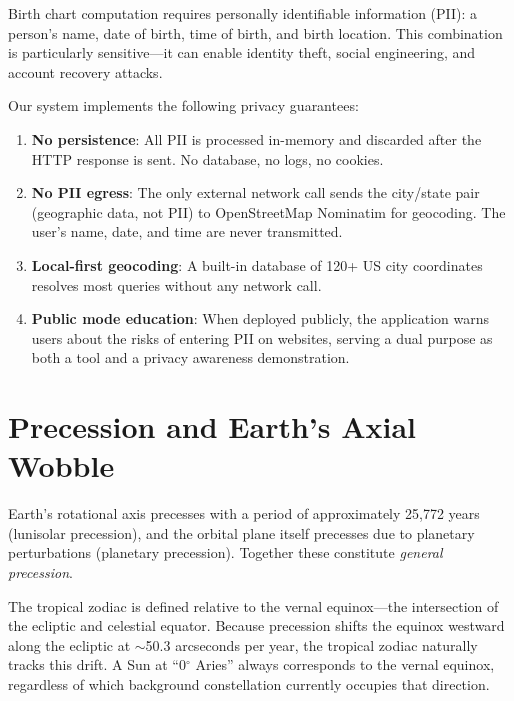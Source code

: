 \documentclass[11pt,letterpaper,twocolumn]{article}
\begin{document}
Birth chart computation requires personally identifiable information (PII): a person's name, date of birth, time of birth, and birth location. This combination is particularly sensitive---it can enable identity theft, social engineering, and account recovery attacks.

Our system implements the following privacy guarantees:

\begin{enumerate}[nosep]
    \item \textbf{No persistence}: All PII is processed in-memory and discarded after the HTTP response is sent. No database, no logs, no cookies.
    \item \textbf{No PII egress}: The only external network call sends the city/state pair (geographic data, not PII) to OpenStreetMap Nominatim for geocoding. The user's name, date, and time are never transmitted.
    \item \textbf{Local-first geocoding}: A built-in database of 120+ US city coordinates resolves most queries without any network call.
    \item \textbf{Public mode education}: When deployed publicly, the application warns users about the risks of entering PII on websites, serving a dual purpose as both a tool and a privacy awareness demonstration.
\end{enumerate}

\section{Precession and Earth's Axial Wobble}\label{sec:precession}

Earth's rotational axis precesses with a period of approximately 25,772 years (lunisolar precession), and the orbital plane itself precesses due to planetary perturbations (planetary precession). Together these constitute \textit{general precession}.

The tropical zodiac is defined relative to the vernal equinox---the intersection of the ecliptic and celestial equator. Because precession shifts the equinox westward along the ecliptic at $\sim$50.3 arcseconds per year, the tropical zodiac naturally tracks this drift. A Sun at ``0$^\circ$ Aries'' always corresponds to the vernal equinox, regardless of which background constellation currently occupies that direction.
\end{document}
